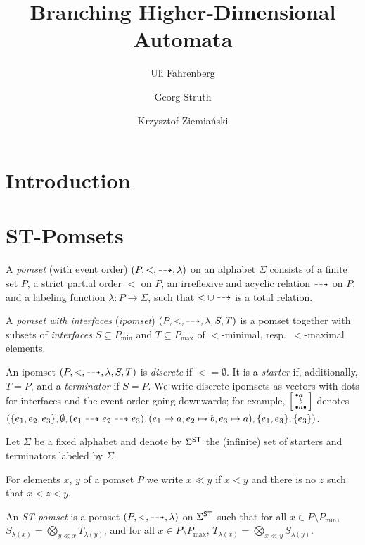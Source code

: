 \documentclass[a4paper,english]{lipics-v2021}
\title{Branching Higher-Dimensional Automata}
\author{Uli Fahrenberg}{LMF, Paris-Saclay University, Gif-sur-Yvette, France}{}{}{}
\author{Georg Struth}{Sheffield}{}{}{}
\author{Krzysztof Ziemiański}{University of Warsaw, Poland}{}{}{}
\begin{document}
\maketitle

\section{Introduction}

\section{ST-Pomsets}

A \emph{pomset} (with event order) $(P, {<}, {\dashrightarrow}, \lambda)$ on an alphabet $\Sigma$
consists of a finite set $P$, a strict partial order $<$ on $P$,
an irreflexive and acyclic relation $\dashrightarrow$ on $P$, and a labeling function $\lambda: P\to \Sigma$,
such that ${<}\cup {\dashrightarrow}$ is a total relation.

A \emph{pomset with interfaces} (\emph{ipomset}) $(P, {<}, {\dashrightarrow}, \lambda, S, T)$
is a pomset together with subsets of \emph{interfaces}
$S\subseteq P_{\min}$ and $T\subseteq P_{\max}$ of $<$-minimal, resp.\ $<$-maximal elements.


An ipomset $(P, {<}, {\dashrightarrow}, \lambda, S, T)$ is \emph{discrete} if ${<}=\emptyset$.
It is a \emph{starter} if, additionally, $T=P$,
and a \emph{terminator} if $S=P$.
We write discrete ipomsets as vectors with dots for interfaces and the event order going downwards; for example,
$\loset{\ibullet a\pibullet \\ \pibullet b\pibullet \\ \ibullet a\ibullet}$ denotes
$(\{e_1, e_2, e_3\}, \emptyset, (e_1\dashrightarrow e_2\dashrightarrow e_3), (e_1\mapsto a, e_2\mapsto b, e_3\mapsto a), \{e_1, e_3\}, \{e_3\})$.

Let $\Sigma$ be a fixed alphabet and denote by $\Sigma^{\textup{\textsf{ST}}}$ the (infinite) set of starters and terminators labeled by $\Sigma$.

For elements $x$, $y$ of a pomset $P$ we write $x\ll y$ if $x<y$ and there is no $z$ such that $x<z<y$.


\begin{definition}
  An \emph{ST-pomset} is a pomset $(P, {<}, {\dashrightarrow}, \lambda)$ on $\Sigma^{\textup{\textsf{ST}}}$ such that for all $x\in P\setminus P_{\min}$,
  $S_{\lambda(x)}=\bigotimes_{y\ll x} T_{\lambda(y)}$, and for all $x\in P\setminus P_{\max}$,
  $T_{\lambda(x)}=\bigotimes_{x\ll y} S_{\lambda(y)}$.
\end{definition}
\end{document}
